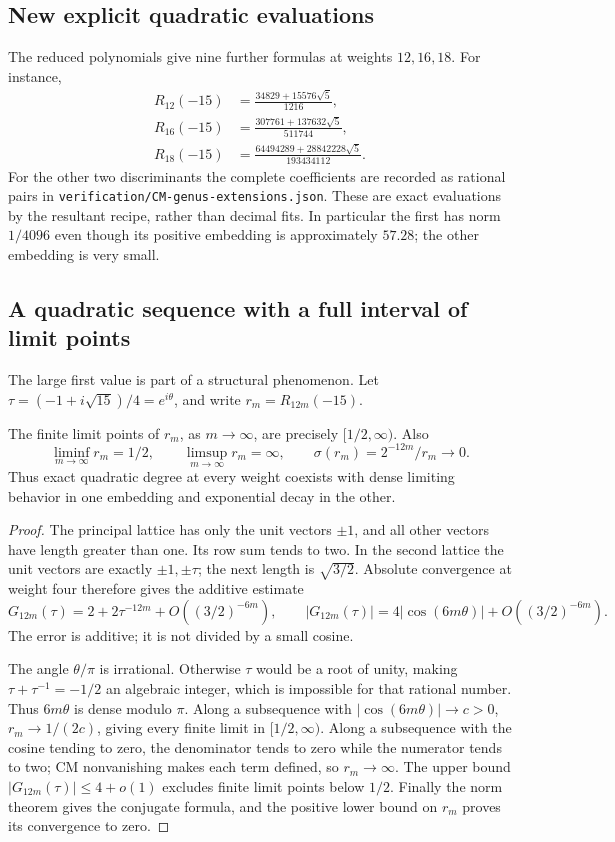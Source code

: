 \subsection{New explicit quadratic evaluations}
The reduced polynomials give nine further formulas at weights $12,16,18$.
For instance,
\begin{align}
 R_{12}(-15)&=\frac{34829+15576\sqrt5}{1216},
       \label{cmextend:eq:r12d15}\\
 R_{16}(-15)&=\frac{307761+137632\sqrt5}{511744},\\
 R_{18}(-15)&=\frac{64494289+28842228\sqrt5}{193434112}.
\end{align}
For the other two discriminants the complete coefficients are recorded as
rational pairs in \texttt{verification/CM-genus-extensions.json}. These
are exact evaluations by the resultant recipe, rather than decimal fits.
In particular the first has norm $1/4096$ even though its positive
embedding is approximately $57.28$; the other embedding is very small.

\subsection{A quadratic sequence with a full interval of limit points}
The large first value is part of a structural phenomenon. Let
$\tau=(-1+i\sqrt{15})/4=e^{i\theta}$, and write $r_m=R_{12m}(-15)$.

\begin{theorem}
\label{cmextend:thm:cluster}
The finite limit points of $r_m$, as $m\to\infty$, are precisely
$[1/2,\infty)$. Also
\[
 \liminf_{m\to\infty}r_m=1/2,\qquad
 \limsup_{m\to\infty}r_m=\infty,\qquad
 \sigma(r_m)=2^{-12m}/r_m\longrightarrow0.
\]
Thus exact quadratic degree at every weight coexists with dense limiting
behavior in one embedding and exponential decay in the other.
\end{theorem}
\begin{proof}
The principal lattice has only the unit vectors $\pm1$, and all other
vectors have length greater than one. Its row sum tends to two.
In the second lattice the unit vectors are exactly $\pm1,\pm\tau$;
the next length is $\sqrt{3/2}$. Absolute convergence at weight four
therefore gives the additive estimate
\[
 G_{12m}(\tau)=2+2\tau^{-12m}+O((3/2)^{-6m}),
 \qquad |G_{12m}(\tau)|=4|\cos(6m\theta)|+O((3/2)^{-6m}).
\]
The error is additive; it is not divided by a small cosine.

The angle $\theta/\pi$ is irrational. Otherwise $\tau$ would be a root
of unity, making $\tau+\tau^{-1}=-1/2$ an algebraic integer, which is
impossible for that rational number. Thus $6m\theta$ is dense modulo
$\pi$. Along a subsequence with $|\cos(6m\theta)|\to c>0$,
$r_m\to1/(2c)$, giving every finite limit in $[1/2,\infty)$.
Along a subsequence with the cosine tending to zero, the denominator
tends to zero while the numerator tends to two; CM nonvanishing makes
each term defined, so $r_m\to\infty$. The upper bound
$|G_{12m}(\tau)|\le4+o(1)$ excludes finite limit points below $1/2$.
Finally the norm theorem gives the conjugate formula, and the positive
lower bound on $r_m$ proves its convergence to zero.
\end{proof}

